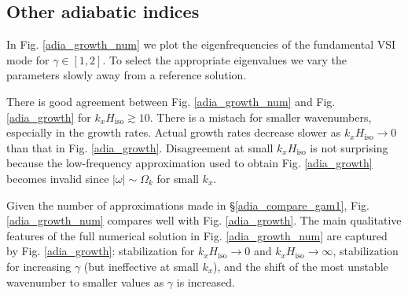 

\subsection{Other adiabatic indices}
In Fig. \ref{adia_growth_num} we plot the eigenfrequencies of the
fundamental VSI mode for $\gamma\in[1,2]$. To select the appropriate
eigenvalues we vary the parameters slowly away from a reference solution.   

There is good agreement between Fig. \ref{adia_growth_num} and
Fig. \ref{adia_growth} for $k_xH_\mathrm{iso}\gtrsim10$. There is a
mistach for smaller wavenumbers, especially in the growth
rates. Actual growth rates decrease slower as $k_xH_\mathrm{iso}\to0$
than that in Fig. \ref{adia_growth}. Disagreement at small
$k_xH_\mathrm{iso}$ is not surprising because the low-frequency
approximation used to obtain Fig. \ref{adia_growth} becomes invalid since
$|\omega|\sim\Omega_k$ for small $k_x$. 

Given the number of approximations made in \S\ref{adia_compare_gam1},
Fig. \ref{adia_growth_num} compares well with
Fig. \ref{adia_growth}. The main qualitative features of the full
numerical solution in Fig. \ref{adia_growth_num} are captured by
Fig. \ref{adia_growth}: stabilization for
$k_xH_\mathrm{iso}\to0$ and $k_xH_\mathrm{iso}\to\infty$,
stabilization for increasing $\gamma$ (but ineffective at small $k_x$), 
and the shift of the most unstable wavenumber to smaller values as
$\gamma$ is increased. 


